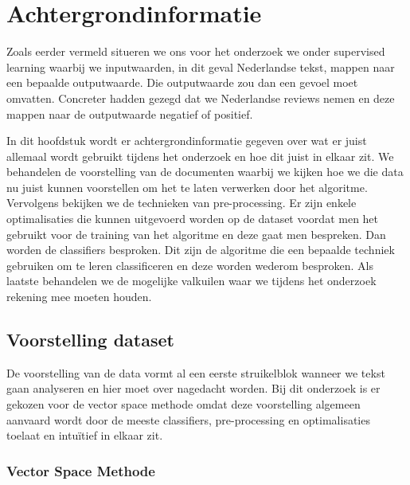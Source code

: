 
\chapter{Achtergrondinformatie}\label{Achtergrondinformatie}

Zoals eerder vermeld situeren we ons voor het onderzoek we onder supervised learning waarbij we inputwaarden, in dit geval Nederlandse tekst, mappen naar een bepaalde outputwaarde. Die outputwaarde zou dan een gevoel moet  omvatten. Concreter hadden gezegd dat we Nederlandse reviews nemen en deze mappen naar de outputwaarde negatief of positief.

In dit hoofdstuk wordt er achtergrondinformatie gegeven over wat er juist allemaal wordt gebruikt tijdens het onderzoek en hoe dit juist in elkaar zit.
We behandelen de voorstelling van de documenten waarbij we kijken hoe we die data nu juist kunnen voorstellen om het te laten verwerken door het algoritme. Vervolgens bekijken we de technieken van pre-processing. Er zijn enkele optimalisaties die kunnen uitgevoerd worden op de dataset voordat men het gebruikt voor de training van het algoritme en deze gaat men bespreken. Dan worden de classifiers besproken. Dit zijn de algoritme die een bepaalde techniek gebruiken om te leren classificeren en deze worden wederom besproken. Als laatste behandelen we de mogelijke valkuilen waar we tijdens het onderzoek rekening mee moeten houden. 


\section{Voorstelling dataset}\label{Voorstelling dataset}

De voorstelling van de data vormt al een eerste struikelblok wanneer we tekst gaan analyseren en hier moet over nagedacht worden. Bij dit onderzoek is er gekozen voor de vector space methode omdat deze voorstelling algemeen aanvaard wordt door de meeste classifiers, pre-processing en optimalisaties toelaat en intu\"itief in elkaar zit.

\subsection{Vector Space Methode}\label{Vector Space Methode}

